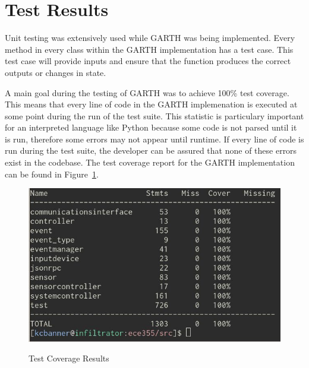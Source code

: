 \documentclass{article}
\begin{document}
\section{Test Results}

Unit testing was extensively used while GARTH was being
implemented. Every method in every class within the GARTH
implementation has a test case. This test case will provide inputs and
ensure that the function produces the correct outputs or changes in
state. 

A main goal during the testing of GARTH was to achieve 100\% test
coverage. This means that every line of code in the GARTH
implemenation is executed at some point during the run of the test
suite. This statistic is particulary important for an interpreted
language like Python because some code is not parsed until it is run,
therefore some errors may not appear until runtime. If every line of
code is run during the test suite, the developer can be assured that
none of these errors exist in the codebase. The test coverage report
for the GARTH implementation can be found in Figure~\ref{fig:test_coverage}.

\begin{figure}[h]
    \centering
        \caption{Test Coverage Results}
        \scriptsize
        \setlength{\unitlength}{2.0em}
        \includegraphics[scale=0.5]{test_coverage.png}
        \normalsize
    \label{fig:test_coverage}
\end{figure}
\end{document}
